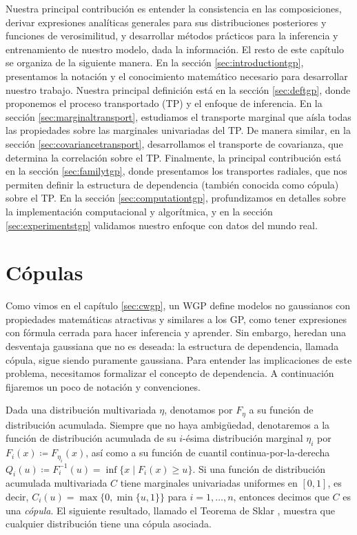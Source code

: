 Nuestra principal contribución es entender la consistencia en las composiciones, derivar expresiones analíticas generales para sus distribuciones posteriores y funciones de verosimilitud, y desarrollar métodos prácticos para la inferencia y entrenamiento de nuestro modelo, dada la información. El resto de este capítulo se organiza de la siguiente manera. En la sección \ref{sec:introductiontgp}, presentamos la notación y el conocimiento matemático necesario para desarrollar nuestro trabajo. Nuestra principal definición está en la sección \ref{sec:deftgp}, donde proponemos el proceso transportado (TP) y el enfoque de inferencia. En la sección \ref{sec:marginaltransport}, estudiamos el transporte marginal que aísla todas las propiedades sobre las marginales univariadas del TP. De manera similar, en la sección \ref{sec:covariancetransport}, desarrollamos el transporte de covarianza, que determina la correlación sobre el TP. Finalmente, la principal contribución está en la sección \ref{sec:familytgp}, donde presentamos los transportes radiales, que nos permiten definir la estructura de dependencia (también conocida como cópula) sobre el TP. En la sección \ref{sec:computationtgp}, profundizamos en detalles sobre la implementación computacional y algorítmica, y en la sección \ref{sec:experimentstgp} validamos nuestro enfoque con datos del mundo real.


\section{Cópulas}

Como vimos en el capítulo \ref{sec:cwgp}, un WGP define modelos no gaussianos con propiedades matemáticas atractivas y similares a los GP, como tener expresiones con fórmula cerrada para hacer inferencia y aprender. Sin embargo, heredan una desventaja gaussiana que no es deseada: la estructura de dependencia, llamada cópula, sigue siendo puramente gaussiana. Para entender las implicaciones de este problema, necesitamos formalizar el concepto de dependencia. A continuación fijaremos un poco de notación y convenciones.

Dada una distribución multivariada \(\eta\), denotamos por \(F_\eta\) a su función de distribución acumulada. Siempre que no haya ambigüedad, denotaremos a la función de distribución acumulada de su \(i\)-ésima distribución marginal \(\eta_{i}\) por \(F_i(x) \coloneqq F_{\eta_i}(x)\), así como a su función de cuantil continua-por-la-derecha \(Q_i(u) \coloneqq F_i^{-1}(u) = \inf \{x \mid F_i(x) \geq u\}\). Si una función de distribución acumulada multivariada \(C\) tiene marginales univariadas uniformes en \([0, 1]\), es decir, \(C_i(u) = \max\{0, \min\{u, 1\}\}\) para \(i = 1, \dotsc, n\), entonces decimos que \(C\) es una \emph{cópula}. El siguiente resultado, llamado el Teorema de Sklar \cite{sklar1959fonctions}, muestra que cualquier distribución tiene una cópula asociada.

